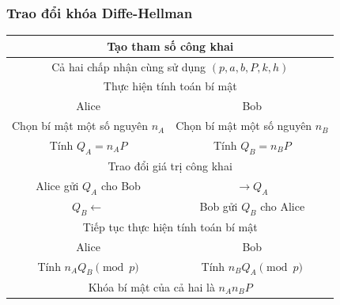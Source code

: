 \documentclass [xcolor=svgnames, t] {beamer}
\theoremstyle{definition}
\begin{document}
\begin{frame}
    \frametitle{Trao đổi khóa Diffe-Hellman}
    \begin{center}

        \begin{tabular}{|c|c|}
            \hline
            \multicolumn{2}{|c|}{Tạo tham số công khai}                              \\
            \hline
            \multicolumn{2}{|c|}{Cả hai chấp nhận cùng sử dụng $(p, a, b, P, k, h)$} \\
            \hline
            \hline
            \multicolumn{2}{|c|}{Thực hiện tính toán bí mật}                         \\
            \hline
            Alice                           & Bob                                    \\
            \hline
            Chọn bí mật một số nguyên $n_A$ & Chọn bí mật một số nguyên $n_B$        \\
            Tính $Q_A = n_AP$               & Tính $Q_B = n_BP$                      \\
            \hline
            \hline
            \multicolumn{2}{|c|}{Trao đổi giá trị công khai}                         \\
            \hline
            Alice gửi $Q_A$ cho Bob         & $\longrightarrow Q_A$                  \\
            $Q_B \longleftarrow$            & Bob gửi $Q_B$ cho Alice                \\
            \hline
            \hline
            \multicolumn{2}{|c|}{Tiếp tục thực hiện tính toán bí mật}                \\
            \hline
            Alice                           & Bob                                    \\
            \hline
            Tính $n_AQ_B \pmod{p}$          & Tính $n_BQ_A \pmod{p}$                 \\
            \hline
            \multicolumn{2}{|c|}{Khóa bí mật của cả hai là $n_An_BP$ }               \\
            \hline
        \end{tabular}

    \end{center}

\end{frame}
\end{document}
